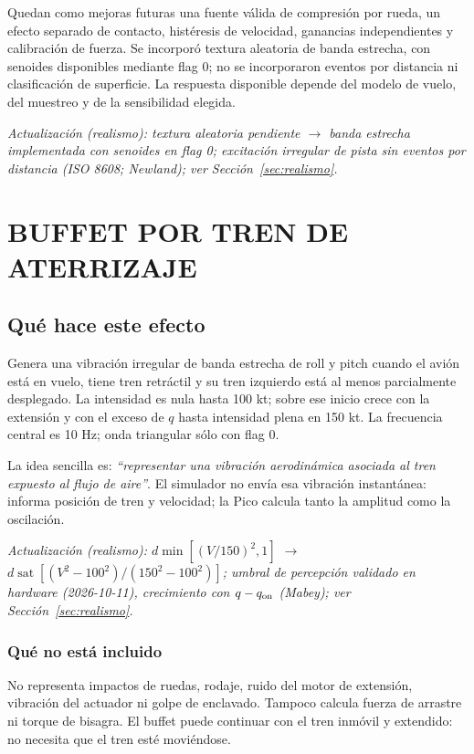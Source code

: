 \documentclass[11pt,a4paper]{article}
\newcommand{\sat}{\operatorname{sat}}
\begin{document}
Quedan como mejoras futuras una fuente válida de compresión por rueda, un efecto separado de contacto, histéresis de velocidad, ganancias independientes y calibración de fuerza. Se incorporó textura aleatoria de banda estrecha, con senoides disponibles mediante flag 0; no se incorporaron eventos por distancia ni clasificación de superficie. La respuesta disponible depende del modelo de vuelo, del muestreo y de la sensibilidad elegida.
\newpage

\textit{Actualización (realismo): textura aleatoria pendiente $\rightarrow$ banda estrecha implementada con senoides en flag 0; excitación irregular de pista sin eventos por distancia (ISO 8608; Newland); ver Sección~\ref{sec:realismo}.}

\section{BUFFET POR TREN DE ATERRIZAJE}
\label{sec:buffet-tren}

\subsection{Qué hace este efecto}
Genera una vibración irregular de banda estrecha de roll y pitch cuando el avión está en vuelo, tiene tren retráctil y su tren izquierdo está al menos parcialmente desplegado. La intensidad es nula hasta 100 kt; sobre ese inicio crece con la extensión y con el exceso de $q$ hasta intensidad plena en 150 kt. La frecuencia central es 10 Hz; onda triangular sólo con flag 0.

La idea sencilla es: \emph{``representar una vibración aerodinámica asociada al tren expuesto al flujo de aire''}. El simulador no envía esa vibración instantánea: informa posición de tren y velocidad; la Pico calcula tanto la amplitud como la oscilación.

\textit{Actualización (realismo): $d\min[(V/150)^2,1]$ $\rightarrow$ $d\sat[(V^2-100^2)/(150^2-100^2)]$; umbral de percepción validado en hardware (2026-10-11), crecimiento con $q-q_{\rm on}$ (Mabey); ver Sección~\ref{sec:realismo}.}

\subsubsection{Qué no está incluido}
No representa impactos de ruedas, rodaje, ruido del motor de extensión, vibración del actuador ni golpe de enclavado. Tampoco calcula fuerza de arrastre ni torque de bisagra. El buffet puede continuar con el tren inmóvil y extendido: no necesita que el tren esté moviéndose.
\end{document}
